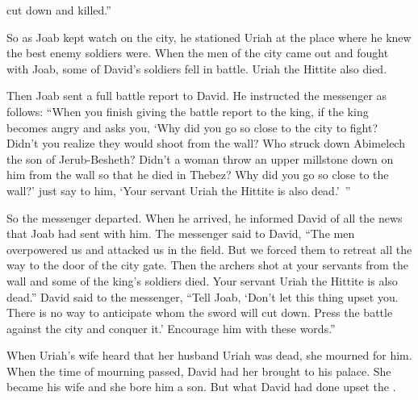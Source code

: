{cut down and killed.”
\par }{\PP {}So
as Joab
kept watch
on the city,
he stationed
Uriah
at the place
where
he knew
the best enemy
soldiers were.
When
the men
of the city
came out
and fought
with
Joab,
some
of David’s
soldiers
fell
in battle. Uriah
the Hittite
also
died.
\par }{\PP {}Then Joab
sent
a full battle
report
to David.
He instructed
the messenger
as follows: “When you finish
giving
the battle
report
to
the king,
if
the king
becomes
angry
and asks
you, ‘Why
did you go so close
to
the city
to fight? Didn’t
you realize
they would shoot
from the wall?
Who
struck down
Abimelech
the son
of Jerub-Besheth? Didn’t
a woman
throw
an upper
millstone
down on
him from the wall
so that he died
in Thebez? Why
did you go so close
to
the wall?’ just say
to him, ‘Your servant
Uriah
the Hittite
is also
dead.’ ”
\par }{\PP {}So
the messenger
departed.
When he arrived,
he informed
David
of all
the news that
Joab
had
sent with him.
The messenger
said
to
David,
“The men
overpowered
us and attacked
us in the field.
But we forced them to retreat all the way
to the door
of the city gate.
Then
the archers
shot
at your servants
from the wall
and some of the king’s
soldiers
died.
Your servant
Uriah
the Hittite
is also
dead.”
David
said
to
the messenger,
“Tell
Joab,
‘Don’t
let this
thing
upset
you. There is no way to anticipate whom the sword
will cut down.
Press
the battle
against the city
and conquer
it.’ Encourage him with these words.”
\par }{\PP {}When Uriah’s
wife
heard
that
her husband
Uriah
was dead,
she mourned for him.
When the time of mourning
passed,
David
had
her brought
to
his palace.
She became
his wife
and she bore
him a son.
But what
David
had
done
upset
the {}.

}
